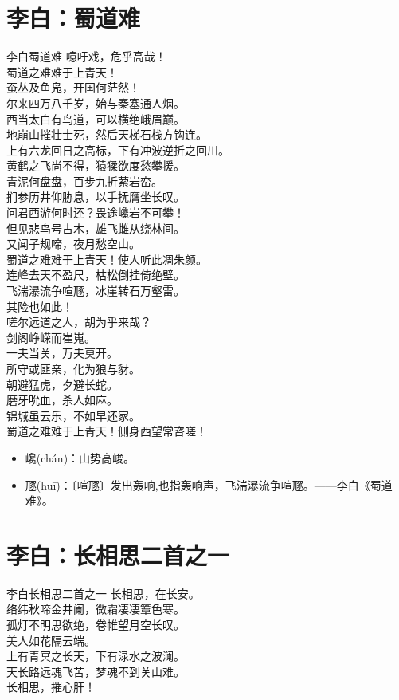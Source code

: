 \documentclass[12pt,oneside,a5paper]{book}
\begin{document}
\chapter{李白：蜀道难}
\begin{poemzh}{李白}{蜀道难}
噫吁戏，危乎高哉！\\
蜀道之难难于上青天！\\
蚕丛及鱼凫，开国何茫然！\\
尔来四万八千岁，始与秦塞通人烟。\\
西当太白有鸟道，可以横绝峨眉巅。\\
地崩山摧壮士死，然后天梯石栈方钩连。\\
上有六龙回日之高标，下有冲波逆折之回川。\\
黄鹤之飞尚不得，猿猱欲度愁攀援。\\
青泥何盘盘，百步九折萦岩峦。\\
扪参历井仰胁息，以手抚膺坐长叹。\\
问君西游何时还？畏途巉岩不可攀！\\
但见悲鸟号古木，雄飞雌从绕林间。\\
又闻子规啼，夜月愁空山。\\
蜀道之难难于上青天！使人听此凋朱颜。\\
连峰去天不盈尺，枯松倒挂倚绝壁。\\
飞湍瀑流争喧豗，冰崖转石万壑雷。\\
其险也如此！\\
嗟尔远道之人，胡为乎来哉？\\
剑阁峥嵘而崔嵬。\\
一夫当关，万夫莫开。\\
所守或匪亲，化为狼与豺。\\
朝避猛虎，夕避长蛇。\\
磨牙吮血，杀人如麻。\\
锦城虽云乐，不如早还家。\\
蜀道之难难于上青天！侧身西望常咨嗟！\\ 
\end{poemzh}

\begin{itemize}
\item 巉(chán)：山势高峻。
\item 豗(huī)：〔喧豗〕发出轰响,也指轰响声，飞湍瀑流争喧豗。——李白《蜀道难》。
\end{itemize}


\chapter{李白：长相思二首之一}
\begin{poemzh}{李白}{长相思二首之一}
长相思，在长安。\\
络纬秋啼金井阑，微霜凄凄簟色寒。\\
孤灯不明思欲绝，卷帷望月空长叹。\\
美人如花隔云端。\\
上有青冥之长天，下有渌水之波澜。\\
天长路远魂飞苦，梦魂不到关山难。\\
长相思，摧心肝！\\ 
\end{poemzh}
\end{document}
